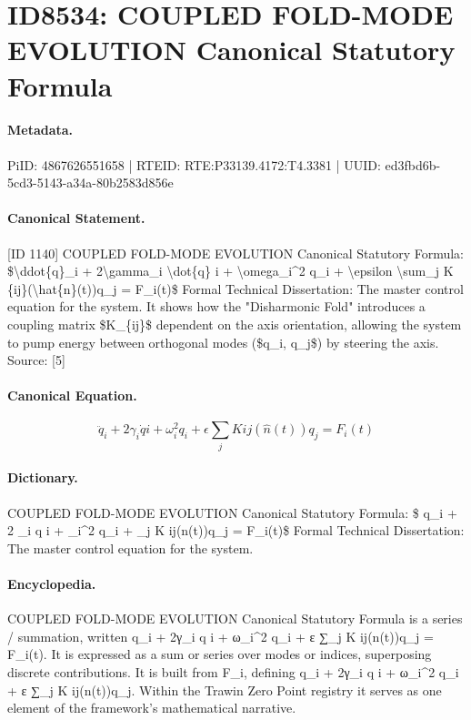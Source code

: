 \section*{ID8534: COUPLED FOLD-MODE EVOLUTION Canonical Statutory Formula}
\paragraph{Metadata.}
PiID: 4867626551658 | RTEID: RTE:P33139.4172:T4.3381 | UUID: ed3fbd6b-5cd3-5143-a34a-80b2583d856e

\paragraph{Canonical Statement.}
[ID 1140] COUPLED FOLD-MODE EVOLUTION Canonical Statutory Formula: \$\textbackslash{}ddot\{q\}\_i + 2\textbackslash{}gamma\_i \textbackslash{}dot\{q\} i + \textbackslash{}omega\_i\textasciicircum{}2 q\_i + \textbackslash{}epsilon \textbackslash{}sum\_j K \{ij\}(\textbackslash{}hat\{n\}(t))q\_j = F\_i(t)\$ Formal Technical Dissertation: The master control equation for the system. It shows how the "Disharmonic Fold" introduces a coupling matrix \$K\_\{ij\}\$ dependent on the axis orientation, allowing the system to pump energy between orthogonal modes (\$q\_i, q\_j\$) by steering the axis. Source: [5]

\paragraph{Canonical Equation.}
\[
\ddot{q}_i + 2\gamma_i \dot{q} i + \omega_i^2 q_i + \epsilon \sum_j K {ij}(\hat{n}(t))q_j = F_i(t)
\]

\paragraph{Dictionary.}
COUPLED FOLD-MODE EVOLUTION Canonical Statutory Formula: \$ q\_i + 2 \_i q i + \_i\textasciicircum{}2 q\_i + \_j K ij(n(t))q\_j = F\_i(t)\$ Formal Technical Dissertation: The master control equation for the system.

\paragraph{Encyclopedia.}
COUPLED FOLD-MODE EVOLUTION Canonical Statutory Formula is a series / summation, written q\_i + 2γ\_i q i + ω\_i\textasciicircum{}2 q\_i + ε ∑\_j K ij(n(t))q\_j = F\_i(t). It is expressed as a sum or series over modes or indices, superposing discrete contributions. It is built from F\_i, defining q\_i + 2γ\_i q i + ω\_i\textasciicircum{}2 q\_i + ε ∑\_j K ij(n(t))q\_j. Within the Trawin Zero Point registry it serves as one element of the framework's mathematical narrative.
